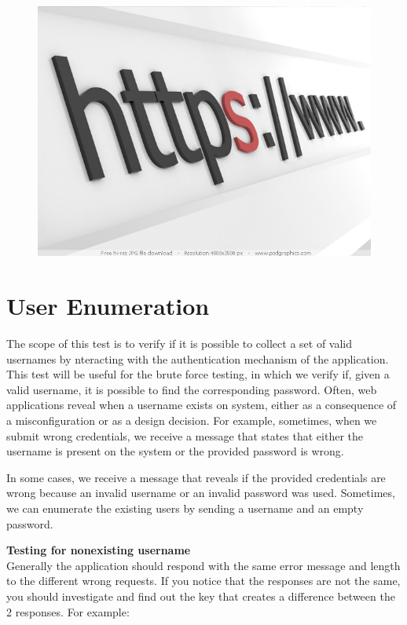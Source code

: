 		\begin{figure}[H]
			\includegraphics[scale=0.4]{pics/https.jpg}
		\end{figure}

\section{User Enumeration}

	The scope of this test is to verify if it is possible to collect a set of valid usernames by 
	nteracting with the authentication mechanism of the application. This test will be useful for the 
	brute force testing, in which we verify if, given a valid username, it is possible to find the
	corresponding password. Often, web applications reveal when a username exists on system, either 
	as a consequence of a misconfiguration or as a design decision. For example, sometimes, when we 
	submit wrong credentials, we receive a message that states that either the username is present 
	on the system or the provided password is wrong. 

	In some cases, we receive a message that reveals if the provided credentials are wrong because an 
	invalid username or an invalid password was used. Sometimes, we can enumerate the existing users 
	by sending a username and an empty password.

	{\bf Testing for nonexisting username} \\
	Generally the application should respond with the same error message and length to the different 
	wrong requests. If you notice that the responses are not the same, you should investigate and find 
	out the key that creates a difference between the 2 responses. For example:

